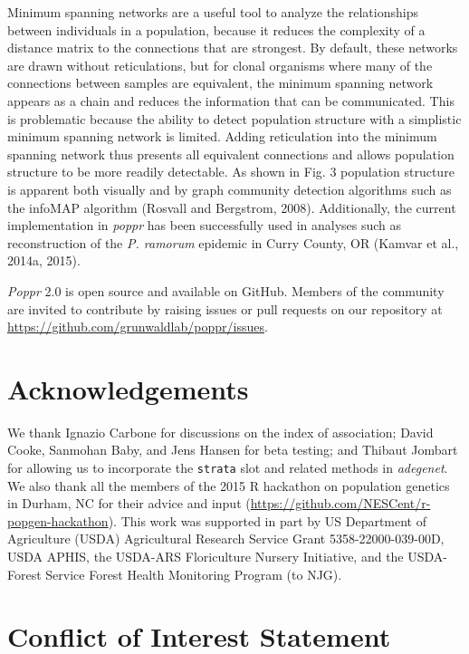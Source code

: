 \documentclass{frontiersSCNS} %
\begin{document}
Minimum spanning networks are a useful tool to analyze the relationships
between individuals in a population, because it reduces the complexity
of a distance matrix to the connections that are strongest. By default,
these networks are drawn without reticulations, but for clonal organisms
where many of the connections between samples are equivalent, the
minimum spanning network appears as a chain and reduces the information
that can be communicated. This is problematic because the ability to
detect population structure with a simplistic minimum spanning network
is limited. Adding reticulation into the minimum spanning network thus
presents all equivalent connections and allows population structure to
be more readily detectable. As shown in Fig. 3 population structure is
apparent both visually and by graph community detection algorithms such
as the infoMAP algorithm (Rosvall and Bergstrom, 2008). Additionally,
the current implementation in \emph{poppr} has been successfully used in
analyses such as reconstruction of the \emph{P. ramorum} epidemic in
Curry County, OR (Kamvar et al., 2014a, 2015).

\emph{Poppr} 2.0 is open source and available on GitHub. Members of the
community are invited to contribute by raising issues or pull requests
on our repository at \url{https://github.com/grunwaldlab/poppr/issues}.

\section*{Acknowledgements}\label{acknowledgements}

We thank Ignazio Carbone for discussions on the index of association;
David Cooke, Sanmohan Baby, and Jens Hansen for beta testing; and
Thibaut Jombart for allowing us to incorporate the \texttt{strata} slot
and related methods in \emph{adegenet}. We also thank all the members of
the 2015 R hackathon on population genetics in Durham, NC for their
advice and input (\url{https://github.com/NESCent/r-popgen-hackathon}).
This work was supported in part by US Department of Agriculture (USDA)
Agricultural Research Service Grant 5358-22000-039-00D, USDA APHIS, the
USDA-ARS Floriculture Nursery Initiative, and the USDA-Forest Service
Forest Health Monitoring Program (to NJG).

\section*{Conflict of Interest
Statement}\label{conflict-of-interest-statement}
\end{document}
